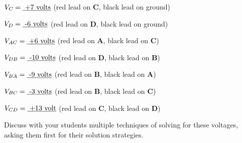 $V_C = \hbox{\underbar{ +7 volts}}$ (red lead on {\bf C}, black lead on ground)

\vskip 5pt

$V_D = \hbox{\underbar{ -6 volts}}$ (red lead on {\bf D}, black lead on ground)

\vskip 20pt

\goodbreak

$V_{AC} = \hbox{\underbar{ +6 volts}}$ (red lead on {\bf A}, black lead on {\bf C})

\vskip 5pt

$V_{DB} = \hbox{\underbar{ -10 volts}}$ (red lead on {\bf D}, black lead on {\bf B})

\vskip 5pt

$V_{BA} = \hbox{\underbar{ -9 volts}}$ (red lead on {\bf B}, black lead on {\bf A})

\vskip 5pt

$V_{BC} = \hbox{\underbar{ -3 volts}}$ (red lead on {\bf B}, black lead on {\bf C})

\vskip 5pt

$V_{CD} = \hbox{\underbar{ +13 volt}}$ (red lead on {\bf C}, black lead on {\bf D})







Discuss with your students multiple techniques of solving for these voltages, asking them first for their solution strategies.




